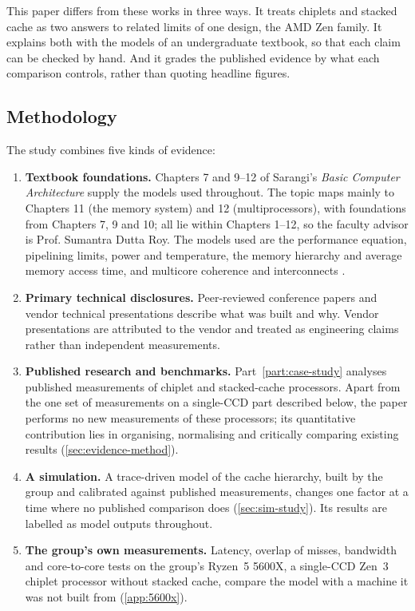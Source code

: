 This paper differs from these works in three ways. It treats chiplets and stacked cache as two answers to related limits of one design, the AMD Zen family. It explains both with the models of an undergraduate textbook, so that each claim can be checked by hand. And it grades the published evidence by what each comparison controls, rather than quoting headline figures.

\subsection{Methodology}
\label{sec:method-overview}

The study combines five kinds of evidence:

\begin{enumerate}
  \item \textbf{Textbook foundations.} Chapters 7 and 9--12 of Sarangi's \emph{Basic Computer Architecture} supply the models used throughout. The topic maps mainly to Chapters 11 (the memory system) and 12 (multiprocessors), with foundations from Chapters 7, 9 and 10; all lie within Chapters 1--12, so the faculty advisor is Prof. Sumantra Dutta Roy. The models used are the performance equation, pipelining limits, power and temperature, the memory hierarchy and average memory access time, and multicore coherence and interconnects \cite{sarangi2025basic}.
  \item \textbf{Primary technical disclosures.} Peer-reviewed conference papers and vendor technical presentations describe what was built and why. Vendor presentations are attributed to the vendor and treated as engineering claims rather than independent measurements.
  \item \textbf{Published research and benchmarks.} Part~\ref{part:case-study} analyses published measurements of chiplet and stacked-cache processors. Apart from the one set of measurements on a single-CCD part described below, the paper performs no new measurements of these processors; its quantitative contribution lies in organising, normalising and critically comparing existing results (\cref{sec:evidence-method}).
  \item \textbf{A simulation.} A trace-driven model of the cache hierarchy, built by the group and calibrated against published measurements, changes one factor at a time where no published comparison does (\cref{sec:sim-study}). Its results are labelled as model outputs throughout.
  \item \textbf{The group's own measurements.} Latency, overlap of misses, bandwidth and core-to-core tests on the group's Ryzen~5 5600X, a single-CCD Zen~3 chiplet processor without stacked cache, compare the model with a machine it was not built from (\cref{app:5600x}).
\end{enumerate}

